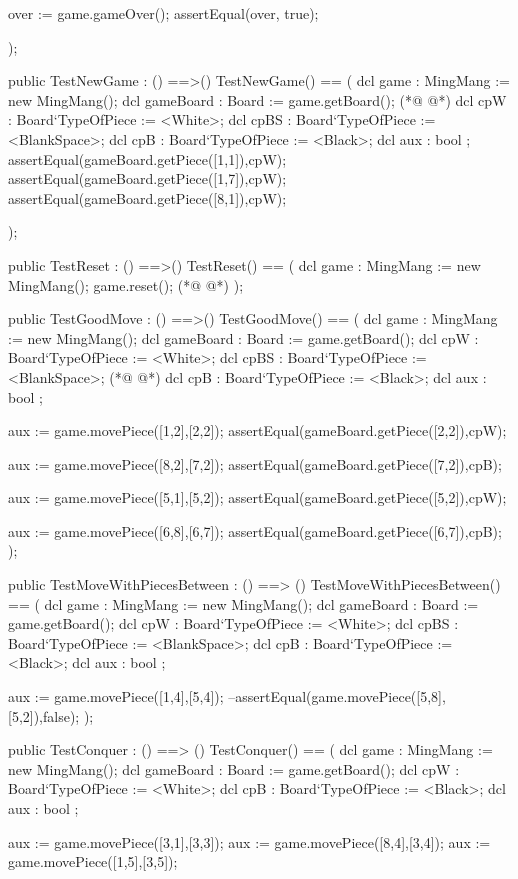 \begin{vdmpp}[breaklines=true]
   over := game.gameOver();
   assertEqual(over, true);

 );
 
 public TestNewGame : () ==>()
 TestNewGame() ==
 (
  dcl game : MingMang := new MingMang();
  dcl gameBoard : Board := game.getBoard();
(*@
\label{TestMoveWithPiecesBetween:64}
@*)
  dcl cpW : Board`TypeOfPiece := <White>;
  dcl cpBS : Board`TypeOfPiece := <BlankSpace>;
  dcl cpB : Board`TypeOfPiece := <Black>;
  dcl aux : bool ;
  assertEqual(gameBoard.getPiece([1,1]),cpW);
  assertEqual(gameBoard.getPiece([1,7]),cpW);
  assertEqual(gameBoard.getPiece([8,1]),cpW);
  
 );
 
 public TestReset : () ==>()
 TestReset() ==
 (
  dcl game : MingMang := new MingMang();
  game.reset();
(*@
\label{TestCanConquer:79}
@*)
 );
 
 
 public TestGoodMove : () ==>()
 TestGoodMove() ==
 (
  dcl game : MingMang := new MingMang(); 
  dcl gameBoard : Board := game.getBoard();
  dcl cpW : Board`TypeOfPiece := <White>;
  dcl cpBS : Board`TypeOfPiece := <BlankSpace>;
(*@
\label{TestConquer:89}
@*)
  dcl cpB : Board`TypeOfPiece := <Black>;
  dcl aux : bool ;
  
  aux := game.movePiece([1,2],[2,2]);
  assertEqual(gameBoard.getPiece([2,2]),cpW);
  
  aux := game.movePiece([8,2],[7,2]);
  assertEqual(gameBoard.getPiece([7,2]),cpB);
  
  aux := game.movePiece([5,1],[5,2]);
  assertEqual(gameBoard.getPiece([5,2]),cpW);
  
  aux := game.movePiece([6,8],[6,7]);
  assertEqual(gameBoard.getPiece([6,7]),cpB);
 );
 
 public TestMoveWithPiecesBetween : () ==> ()
 TestMoveWithPiecesBetween() ==
 (
  dcl game : MingMang := new MingMang(); 
  dcl gameBoard : Board := game.getBoard();
  dcl cpW : Board`TypeOfPiece := <White>;
  dcl cpBS : Board`TypeOfPiece := <BlankSpace>;
  dcl cpB : Board`TypeOfPiece := <Black>;
  dcl aux : bool ;
  
  aux := game.movePiece([1,4],[5,4]);
  --assertEqual(game.movePiece([5,8],[5,2]),false);
 );
 
 
 public TestConquer : () ==> ()
 TestConquer() ==
 (
  dcl game : MingMang := new MingMang(); 
  dcl gameBoard : Board := game.getBoard();
  dcl cpW : Board`TypeOfPiece := <White>;
  dcl cpB : Board`TypeOfPiece := <Black>;
  dcl aux : bool ;
  
  
  aux := game.movePiece([3,1],[3,3]);
  aux := game.movePiece([8,4],[3,4]);
  aux := game.movePiece([1,5],[3,5]);
 

\end{vdmpp}
